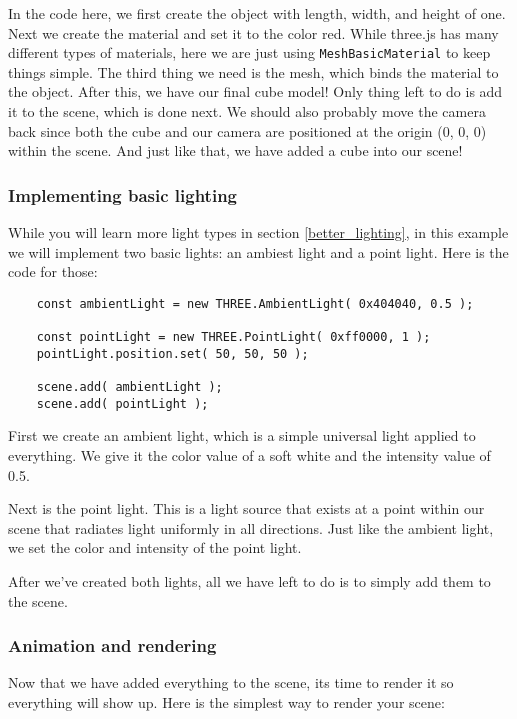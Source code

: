 \documentclass[10pt,final,journal,compsoc]{IEEEtran}
\begin{document}
        In the code here, we first create the object with length, width, and height of one. Next we create the material and set it to the color red. While three.js has many different types of materials, here we are just using \verb|MeshBasicMaterial| to keep things simple. The third thing we need is the mesh, which binds the material to the object. After this, we have our final cube model! Only thing left to do is add it to the scene, which is done next. We should also probably move the camera back since both the cube and our camera are positioned at the origin (0, 0, 0) within the scene. And just like that, we have added a cube into our scene!
        
        \subsubsection{Implementing basic lighting} 
        While you will learn more light types in section \ref{better_lighting}, in this example we will implement two basic lights: an ambiest light and a point light. Here is the code for those:
        
        \begin{lstlisting}
    const ambientLight = new THREE.AmbientLight( 0x404040, 0.5 );
        
    const pointLight = new THREE.PointLight( 0xff0000, 1 );
    pointLight.position.set( 50, 50, 50 );
        
    scene.add( ambientLight );
    scene.add( pointLight );
        \end{lstlisting}
        
        First we create an ambient light, which is a simple universal light applied to everything. We give it the color value of a soft white and the intensity value of 0.5.
        
        Next is the point light. This is a light source that exists at a point within our scene that radiates light uniformly in all directions. Just like the ambient light, we set the color and intensity of the point light.
        
        After we've created both lights, all we have left to do is to simply add them to the scene.
        
        \subsubsection{Animation and rendering} \label{animation_rendering}
        Now that we have added everything to the scene, its time to render it so everything will show up. Here is the simplest way to render your scene:
        
\end{document}
